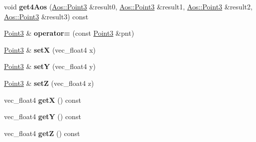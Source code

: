 \begin{DoxyCompactItemize}
\item 
\hypertarget{classVectormath_1_1Soa_1_1Point3_a1f95d915761ce2c5b9e5c96d5b2c88f2}{void {\bfseries get4\-Aos} (\hyperlink{classVectormath_1_1Aos_1_1Point3}{Aos\-::\-Point3} \&result0, \hyperlink{classVectormath_1_1Aos_1_1Point3}{Aos\-::\-Point3} \&result1, \hyperlink{classVectormath_1_1Aos_1_1Point3}{Aos\-::\-Point3} \&result2, \hyperlink{classVectormath_1_1Aos_1_1Point3}{Aos\-::\-Point3} \&result3) const }\label{classVectormath_1_1Soa_1_1Point3_a1f95d915761ce2c5b9e5c96d5b2c88f2}

\item 
\hypertarget{classVectormath_1_1Soa_1_1Point3_a0cdcb6e44e39a5b754e8357ba9425c24}{\hyperlink{classVectormath_1_1Soa_1_1Point3}{Point3} \& {\bfseries operator=} (const \hyperlink{classVectormath_1_1Soa_1_1Point3}{Point3} \&pnt)}\label{classVectormath_1_1Soa_1_1Point3_a0cdcb6e44e39a5b754e8357ba9425c24}

\item 
\hypertarget{classVectormath_1_1Soa_1_1Point3_ab1eb65432aac8cfccf5dcd7ed19cefc7}{\hyperlink{classVectormath_1_1Soa_1_1Point3}{Point3} \& {\bfseries set\-X} (vec\-\_\-float4 x)}\label{classVectormath_1_1Soa_1_1Point3_ab1eb65432aac8cfccf5dcd7ed19cefc7}

\item 
\hypertarget{classVectormath_1_1Soa_1_1Point3_a75d120042c728a367c84d3bdd00481d5}{\hyperlink{classVectormath_1_1Soa_1_1Point3}{Point3} \& {\bfseries set\-Y} (vec\-\_\-float4 y)}\label{classVectormath_1_1Soa_1_1Point3_a75d120042c728a367c84d3bdd00481d5}

\item 
\hypertarget{classVectormath_1_1Soa_1_1Point3_ad1478b32aeaa62ee1ad088edfd03941a}{\hyperlink{classVectormath_1_1Soa_1_1Point3}{Point3} \& {\bfseries set\-Z} (vec\-\_\-float4 z)}\label{classVectormath_1_1Soa_1_1Point3_ad1478b32aeaa62ee1ad088edfd03941a}

\item 
\hypertarget{classVectormath_1_1Soa_1_1Point3_acd60f9abe615c0f5aa0af82342cc6c15}{vec\-\_\-float4 {\bfseries get\-X} () const }\label{classVectormath_1_1Soa_1_1Point3_acd60f9abe615c0f5aa0af82342cc6c15}

\item 
\hypertarget{classVectormath_1_1Soa_1_1Point3_ab929c1c266f9f621070a1dfaaed8b769}{vec\-\_\-float4 {\bfseries get\-Y} () const }\label{classVectormath_1_1Soa_1_1Point3_ab929c1c266f9f621070a1dfaaed8b769}

\item 
\hypertarget{classVectormath_1_1Soa_1_1Point3_a943e670c29dae716d8d085b3b94bd374}{vec\-\_\-float4 {\bfseries get\-Z} () const }\label{classVectormath_1_1Soa_1_1Point3_a943e670c29dae716d8d085b3b94bd374}


\end{DoxyCompactItemize}
